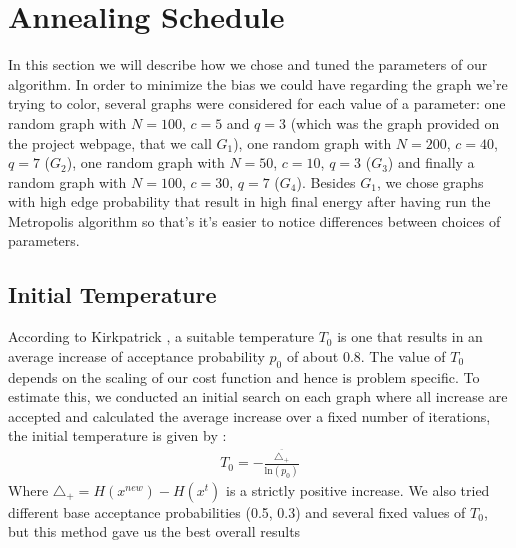 \documentclass[a4paper]{article}
\begin{document}
\section{Annealing Schedule}
In this section we will describe how we chose and tuned the parameters of our algorithm. In order to minimize the bias we could have regarding the graph we're trying to color, several graphs were considered for each value of a parameter: one random graph with $N=100$, $c=5$ and $q=3$ (which was the graph provided on the project webpage, that we call $G_1$), one random graph with $N=200$, $c=40$, $q=7$ ($G_2$), one random graph with $N=50$, $c=10$, $q=3$ ($G_3$) and finally a random graph with $N=100$, $c=30$, $q=7$ ($G_4$). Besides $G_1$, we chose graphs with high edge probability that result in high final energy after having run the Metropolis algorithm so that's it's easier to notice differences between choices of parameters.

\subsection{Initial Temperature}
According to Kirkpatrick \cite{kirkpatrick}, a suitable temperature $T_0$ is one that results in an average increase of acceptance probability $p_0$ of about 0.8. The value of $T_0$ depends on the scaling of our cost function and hence is problem specific. To estimate this, we conducted an initial search on each graph where all increase are accepted and calculated the average increase over a fixed number of iterations, the initial temperature is given by :
\begin{align*}
T_0 = -\frac{\overline{\triangle_+}}{\mathrm{ln}(p_0)}
\end{align*}
Where $\triangle_+ = H(x^{new}) - H(x^t)$ is a strictly positive increase. We also tried different base acceptance probabilities (0.5, 0.3) and several fixed values of $T_0$, but this method gave us the best overall results
\end{document}
